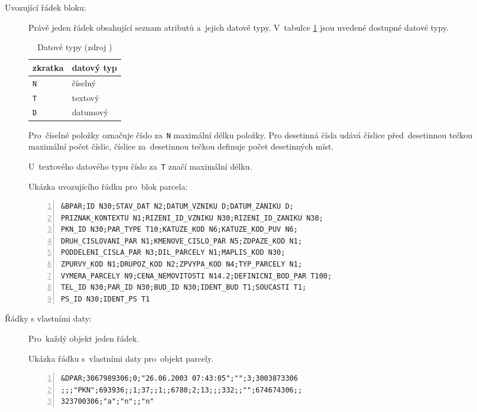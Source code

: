 \begin{description}	
	\item[Uvozující řádek bloku:] Právě jeden řádek obsahující seznam atributů a~jejich datové typy. V~tabulce \ref{tab:datove_typy} jsou uvedené dostupné datové typy.

\begin{table}[H]
    \begin{tabular}{|l|l|}
        \hline
         zkratka & datový typ \\
        \hline
        \hline
         \texttt{N} & číselný \\ \hline
         \texttt{T} & textový \\ \hline
         \texttt{D} & datumový \\
         \hline
    \end{tabular}
    \centering
    \caption[Datové typy]{Datové typy (zdroj \citep{struktura_vfk})}
    \label{tab:datove_typy}
\end{table}

Pro~číselné položky označuje číslo za~\texttt{N} maximální délku položky. Pro desetinná čísla udává číslice před~desetinnou tečkou maximální počet číslic, číslice za~desetinnou tečkou definuje počet desetinných míst.

U~textového datového typu číslo za~\texttt{T} značí maximální délku.

Ukázka uvozujícího řádku pro~blok parcela:

	\begin{lstlisting}[basicstyle=\footnotesize\ttfamily, backgroundcolor = \color{light-gray},  numbers=left]
&BPAR;ID N30;STAV_DAT N2;DATUM_VZNIKU D;DATUM_ZANIKU D;
PRIZNAK_KONTEXTU N1;RIZENI_ID_VZNIKU N30;RIZENI_ID_ZANIKU N30;
PKN_ID N30;PAR_TYPE T10;KATUZE_KOD N6;KATUZE_KOD_PUV N6;
DRUH_CISLOVANI_PAR N1;KMENOVE_CISLO_PAR N5;ZDPAZE_KOD N1;
PODDELENI_CISLA_PAR N3;DIL_PARCELY N1;MAPLIS_KOD N30;
ZPURVY_KOD N1;DRUPOZ_KOD N2;ZPVYPA_KOD N4;TYP_PARCELY N1;
VYMERA_PARCELY N9;CENA_NEMOVITOSTI N14.2;DEFINICNI_BOD_PAR T100;
TEL_ID N30;PAR_ID N30;BUD_ID N30;IDENT_BUD T1;SOUCASTI T1;
PS_ID N30;IDENT_PS T1
	\end{lstlisting}

	\item[Řádky s vlastními daty:] Pro~každý objekt jeden řádek.

Ukázka řádku s~vlastními daty pro~objekt parcely.
	
	\begin{lstlisting}[basicstyle=\footnotesize\ttfamily, backgroundcolor = \color{light-gray},  numbers=left]
&DPAR;3067989306;0;"26.06.2003 07:43:05";"";3;3003873306
;;;"PKN";693936;;1;37;;1;;6780;2;13;;;332;;"";674674306;;
323700306;"a";"n";;"n"
	\end{lstlisting}
\end{description}

